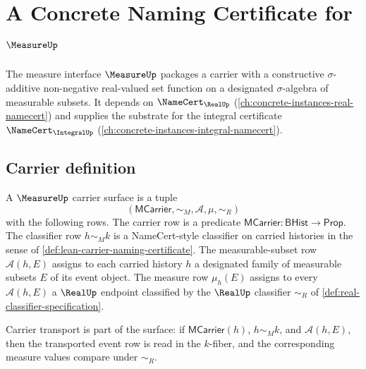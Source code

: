 \chapter{A Concrete Naming Certificate for $\MeasureUp$}
\label{ch:concrete-instances-measure-namecert}

The measure interface $\MeasureUp$ packages a carrier with a constructive $\sigma$-additive non-negative real-valued set function on a designated $\sigma$-algebra of measurable subsets. It depends on $\NameCert_{\RealUp}$ (\autoref{ch:concrete-instances-real-namecert}) and supplies the substrate for the integral certificate $\NameCert_{\IntegralUp}$ (\autoref{ch:concrete-instances-integral-namecert}).

\section{Carrier definition}
\label{sec:measure-carrier}

\begin{definition}
\label{def:measureup-carrier-surface}
\label{def:measure-carrier-specification}
A $\MeasureUp$ carrier surface is a tuple
$$
(\mathsf{MCarrier},\sim_M,\mathcal{A},\mu,\sim_R)
$$
with the following rows. The carrier row is a predicate
$\mathsf{MCarrier}:\mathsf{BHist}\to\mathsf{Prop}$. The classifier row
$h\sim_M k$ is a NameCert-style classifier on carried histories in the sense of
\autoref{def:lean-carrier-naming-certificate}. The measurable-subset row
$\mathcal{A}(h,E)$ assigns to each carried history $h$ a designated family of
measurable subsets $E$ of its event object. The measure row
$\mu_h(E)$ assigns to every $\mathcal{A}(h,E)$ a $\RealUp$ endpoint classified
by the $\RealUp$ classifier $\sim_R$ of
\autoref{def:real-classifier-specification}.

Carrier transport is part of the surface: if $\mathsf{MCarrier}(h)$,
$h\sim_M k$, and $\mathcal{A}(h,E)$, then the transported event row is read in
the $k$-fiber, and the corresponding measure values compare under $\sim_R$.
\end{definition}

